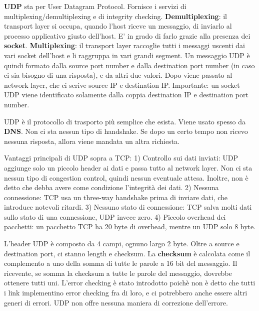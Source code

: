 \documentclass[a4paper,10pt]{article} %
\renewcommand{\b}[1]{%
    {\textbf{#1}}}
\begin{document}
\b{UDP} sta per User Datagram Protocol. Fornisce i servizi di multiplexing/demultiplexing e di integrity checking.
\b{Demultiplexing}: il transport layer si occupa, quando l'host riceve un messaggio, di inviarlo al processo applicativo giusto dell'host. E' in grado di farlo grazie alla presenza dei \b{socket}. \b{Multiplexing}: il transport layer raccoglie tutti i messaggi uscenti dai vari socket dell'host e li raggruppa in vari grandi segment.
Un messaggio UDP è quindi formato dalla source port number e dalla destination port number (in caso ci sia bisogno di una risposta), e da altri due valori. Dopo viene passato al network layer, che ci scrive source IP e destination IP.
Importante: un socket UDP viene identificato solamente dalla coppia destination IP e destination port number.

UDP è il protocollo di trasporto più semplice che esista. Viene usato spesso da \b{DNS}. Non ci sta nessun tipo di handshake. Se dopo un certo tempo non ricevo nessuna risposta, allora viene mandata un altra richiesta.

Vantaggi principali di UDP sopra a TCP:
1) Controllo sui dati inviati: UDP aggiunge solo un piccolo header ai dati e passa tutto al network layer. Non ci sta nessun tipo di congestion control, quindi nessun eventuale attesa. Inoltre, non è detto che debba avere come condizione l'integrità dei dati.
2) Nessuna connessione: TCP usa un three-way handshake prima di inviare dati, che introduce notevoli ritardi.
3) Nessuno stato di connessione: TCP salva molti dati sullo stato di una connessione, UDP invece zero.
4) Piccolo overhead dei pacchetti: un pacchetto TCP ha 20 byte di overhead, mentre un UDP solo 8 byte.

L'header UDP è composto da 4 campi, ognuno largo 2 byte. Oltre a source e destination port, ci stanno length e checksum. La \b{checksum} è calcolata come il complemento a uno della somma di tutte le parole a 16 bit del messaggio. Il ricevente, se somma la checksum a tutte le parole del messaggio, dovrebbe ottenere tutti uni. L'error checking è stato introdotto poichè non è detto che tutti i link implementino error checking fra di loro, e ci potrebbero anche essere altri generi di errori. UDP non offre nessuna maniera di correzione dell'errore.
\end{document}
